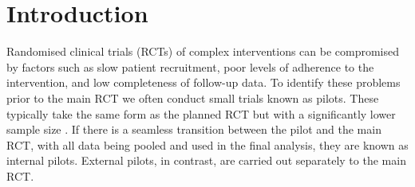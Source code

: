 \documentclass[AMA,STIX1COL]{WileyNJD-v2}
\begin{document}
\maketitle

\section{Introduction}\label{sec:introduction}


Randomised clinical trials (RCTs) of complex interventions can be compromised by factors such as slow patient recruitment, poor levels of adherence to the intervention, and low completeness of follow-up data. To identify these problems prior to the main RCT we often conduct small trials \cite{Craig2008} known as pilots. These typically take the same form as the planned RCT but with a significantly lower sample size \cite{Eldridge2016}. If there is a seamless transition between the pilot and the main RCT, with all data being pooled and used in the final analysis, they are known as internal pilots. External pilots, in contrast, are carried out separately to the main RCT.




\end{document}
